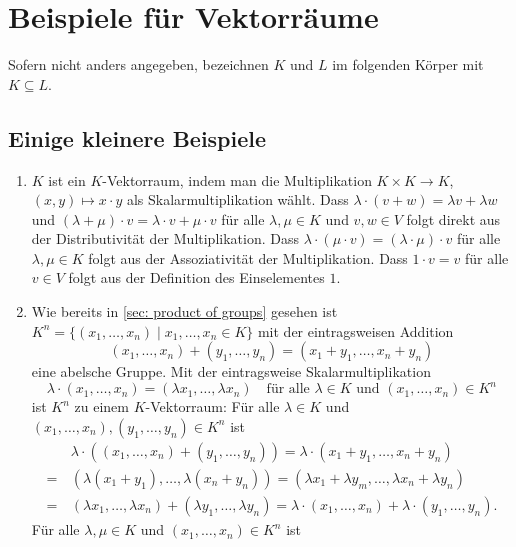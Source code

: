\chapter{Beispiele für Vektorräume}
Sofern nicht anders angegeben, bezeichnen $K$ und $L$ im folgenden Körper mit $K \subseteq L$.





\section{Einige kleinere Beispiele}
\begin{enumerate}[leftmargin=*]
 \item
  $K$ ist ein $K$-Vektorraum, indem man die Multiplikation $K \times K \to K$, $(x,y) \mapsto x \cdot y$ als Skalarmultiplikation wählt. Dass $\lambda \cdot (v+w) = \lambda v + \lambda w$ und $(\lambda+\mu) \cdot v = \lambda \cdot v + \mu \cdot v$ für alle $\lambda, \mu \in K$ und $v,w \in V$ folgt direkt aus der Distributivität der Multiplikation. Dass $\lambda \cdot (\mu \cdot v) = (\lambda \cdot \mu) \cdot v$ für alle $\lambda, \mu \in K$ folgt aus der Assoziativität der Multiplikation. Dass $1 \cdot v = v$ für alle $v \in V$ folgt aus der Definition des Einselementes $1$.
 \item
  Wie bereits in \ref{sec: product of groups} gesehen ist $K^n = \{(x_1, \dotsc, x_n) \mid x_1, \dotsc, x_n \in K\}$ mit der eintragsweisen Addition
  \[
   (x_1, \dotsc, x_n) + (y_1, \dotsc, y_n)
   = (x_1 + y_1, \dotsc, x_n + y_n)
  \]
  eine abelsche Gruppe. Mit der eintragsweise Skalarmultiplikation
  \[
   \lambda \cdot (x_1, \dotsc, x_n)
   = (\lambda x_1, \dotsc, \lambda x_n)
   \quad
   \text{für alle $\lambda \in K$ und $(x_1, \dotsc, x_n) \in K^n$}
  \]
  ist $K^n$ zu einem $K$-Vektorraum: Für alle $\lambda \in K$ und $(x_1, \dotsc, x_n), (y_1, \dotsc, y_n) \in K^n$ ist
  \begin{align*}
    &\, \lambda \cdot ((x_1, \dotsc, x_n) + (y_1, \dotsc, y_n))
   =    \lambda \cdot (x_1 + y_1, \dotsc, x_n + y_n) \\
   =&\, (\lambda (x_1 + y_1), \dotsc, \lambda (x_n + y_n))
   =    (\lambda x_1 + \lambda y_m, \dotsc, \lambda x_n + \lambda y_n) \\
   =&\, (\lambda x_1, \dotsc, \lambda x_n) + (\lambda y_1, \dotsc, \lambda y_n)
   =    \lambda \cdot (x_1, \dotsc, x_n) + \lambda \cdot (y_1, \dotsc, y_n).
  \end{align*}
  Für alle $\lambda, \mu \in K$ und $(x_1, \dotsc, x_n) \in K^n$ ist

\end{enumerate}
